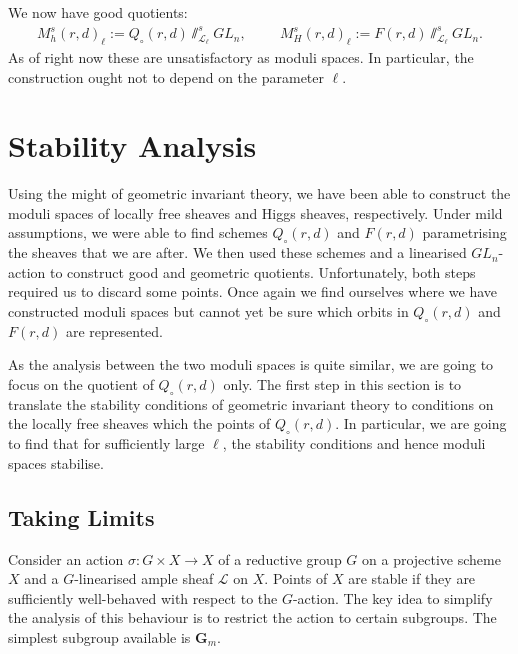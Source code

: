 \documentclass[12pt]{ociamthesis}  %
\begin{document}
\begin{example}
  We now have good quotients:
  \begin{align*}
    M^{s}_h(r,d)_\ell := Q_\circ(r,d)\sslash^s_{\mathscr L_\ell} GL_n, \hspace{1cm}
    M^{s}_H(r,d)_\ell := F(r,d)\sslash^s_{\mathscr L_\ell} GL_n.
  \end{align*}
  As of right now these are unsatisfactory as moduli spaces. In particular,
  the construction ought not to depend on the parameter $\ell$.
\end{example}


\section{Stability Analysis}

Using the might of geometric invariant theory, we have been able
to construct the moduli spaces of locally free sheaves and Higgs
sheaves, respectively. Under mild assumptions, we were able to
find schemes $Q_\circ(r,d)$ and $F(r,d)$ parametrising the sheaves
that we are after. We then used these schemes and a linearised
$GL_n$-action to construct good and geometric quotients.
Unfortunately, both steps required us to discard some points.
Once again we find ourselves where we have constructed moduli spaces
but cannot yet be sure which orbits in $Q_\circ(r,d)$ and $F(r,d)$
are represented.

As the analysis between the two moduli spaces is quite similar,
we are going to focus on the quotient of $Q_\circ(r,d)$ only.
The first step in this section is to translate the stability
conditions of geometric invariant theory to conditions on the locally
free sheaves which the points of $Q_\circ(r,d)$.  In particular, we
are going to find that for sufficiently large $\ell$,
the stability conditions and hence moduli spaces stabilise.

\subsection{Taking Limits}

Consider an action $\sigma : G \times X\to X$ of a reductive group $G$
on a projective scheme $X$ and a $G$-linearised ample sheaf
$\mathscr L$ on $X$. Points of $X$ are stable if they are sufficiently
well-behaved with respect to the $G$-action. The key idea to simplify
the analysis of this behaviour is to restrict the action to certain
subgroups. The simplest subgroup available is $\mathbf G_m$.
\end{document}
